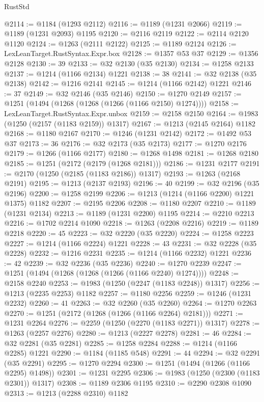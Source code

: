 \begin{lexlean}{RustStd}
\begin{coremodule}
@2114 := @1184 (@1293 @2112)
@2116 := @1189 (@1231 @2066)
@2119 := @1189 (@1231 @2093) @1195
@2120 := @2116 @2119
@2122 := @2114 @2120 @1120
@2124 := @1263 (@2111 @2122)
@2125 := @1189 @2124
@2126 := LexLeanTarget.RustSyntax.Expr.box
@2128 := @1357 @53 @37
@2129 := @1356 @2128
@2130 := 39
@2133 := @32 @2130 (@35 @2130)
@2134 := @1258 @2133
@2137 := @1214 (@1166 @2134) @1221
@2138 := 38
@2141 := @32 @2138 (@35 @2138)
@2142 := @1216 @2141
@2145 := @1214 (@1166 @2142) @1221
@2146 := 37
@2149 := @32 @2146 (@35 @2146)
@2150 := @1270 @2149
@2157 := @1251 (@1494 (@1268 (@1268 (@1266 (@1166 @2150) @1274))))
@2158 := LexLeanTarget.RustSyntax.Expr.unbox
@2159 := @2158 @2150
@2164 := @1983 (@1250 (@2157 (@1183 @2159)) @1317)
@2167 := @1213 (@2145 @2164) @1182
@2168 := @1180 @2167
@2170 := @1246 (@1231 @2142)
@2172 := @1492 @53 @37
@2173 := 36
@2176 := @32 @2173 (@35 @2173)
@2177 := @1270 @2176
@2179 := @1266 (@1166 @2177)
@2180 := @1268 @1498
@2181 := @1268 @2180
@2185 := @1251 (@2172 (@2179 (@1268 @2181)))
@2186 := @1231 @2177
@2191 := @2170 (@1250 (@2185 (@1183 @2186)) @1317)
@2193 := @1263 (@2168 @2191)
@2195 := @1213 (@2137 @2193)
@2196 := 40
@2199 := @32 @2196 (@35 @2196)
@2200 := @1258 @2199
@2206 := @1213 (@1214 (@1166 @2200) @1221 @1375) @1182
@2207 := @2195 @2206
@2208 := @1180 @2207
@2210 := @1189 (@1231 @2134)
@2213 := @1189 (@1231 @2200) @1195
@2214 := @2210 @2213
@2216 := @1702 @2214 @1090
@2218 := @1263 (@2208 @2216)
@2219 := @1189 @2218
@2220 := 45
@2223 := @32 @2220 (@35 @2220)
@2224 := @1258 @2223
@2227 := @1214 (@1166 @2224) @1221
@2228 := 43
@2231 := @32 @2228 (@35 @2228)
@2232 := @1216 @2231
@2235 := @1214 (@1166 @2232) @1221
@2236 := 42
@2239 := @32 @2236 (@35 @2236)
@2240 := @1270 @2239
@2247 := @1251 (@1494 (@1268 (@1268 (@1266 (@1166 @2240) @1274))))
@2248 := @2158 @2240
@2253 := @1983 (@1250 (@2247 (@1183 @2248)) @1317)
@2256 := @1213 (@2235 @2253) @1182
@2257 := @1180 @2256
@2259 := @1246 (@1231 @2232)
@2260 := 41
@2263 := @32 @2260 (@35 @2260)
@2264 := @1270 @2263
@2270 := @1251 (@2172 (@1268 (@1266 (@1166 @2264) @2181)))
@2271 := @1231 @2264
@2276 := @2259 (@1250 (@2270 (@1183 @2271)) @1317)
@2278 := @1263 (@2257 @2276)
@2280 := @1213 (@2227 @2278)
@2281 := 46
@2284 := @32 @2281 (@35 @2281)
@2285 := @1258 @2284
@2288 := @1214 (@1166 @2285) @1221
@2290 := @1184 (@1185 @548)
@2291 := 44
@2294 := @32 @2291 (@35 @2291)
@2295 := @1270 @2294
@2300 := @1251 (@1494 (@1266 (@1166 @2295) @1498))
@2301 := @1231 @2295
@2306 := @1983 (@1250 (@2300 (@1183 @2301)) @1317)
@2308 := @1189 @2306 @1195
@2310 := @2290 @2308 @1090
@2313 := @1213 (@2288 @2310) @1182

\end{coremodule}
\end{lexlean}
